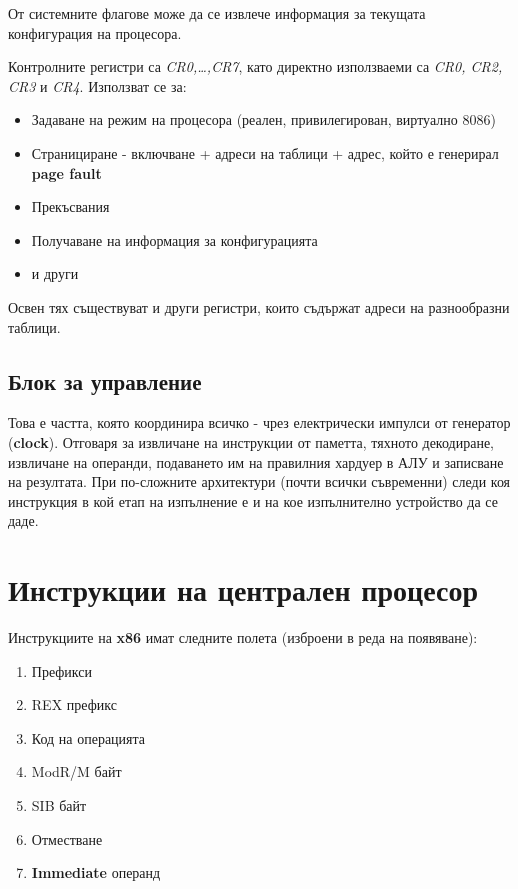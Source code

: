 \documentclass[fleqn,12pt]{article}
\begin{document}
От системните флагове може да се извлече информация за текущата конфигурация на процесора.

Контролните регистри са \textit{CR0,\dots,CR7}, като директно използваеми са \textit{CR0, CR2, CR3} и \textit{CR4}. Използват се за:
\begin{itemize}
    \item Задаване на режим на процесора (реален, привилегирован, виртуално 8086)
    \item Странициране - включване + адреси на таблици + адрес, който е генерирал \textbf{page fault}
    \item Прекъсвания
    \item Получаване на информация за конфигурацията
    \item и други
\end{itemize}

Освен тях съществуват и други регистри, които съдържат адреси на разнообразни таблици.

\subsection{Блок за управление}
Това е частта, която координира всичко - чрез електрически импулси от генератор (\textbf{clock}).
Отговаря за извличане на инструкции от паметта, тяхното декодиране, извличане на операнди, подаването им
на правилния хардуер в АЛУ и записване на резултата. При по-сложните архитектури (почти всички съвременни)
следи коя инструкция в кой етап на изпълнение е и на кое изпълнително устройство да се даде.

\section{Инструкции на централен процесор}
Инструкциите на \textbf{x86} имат следните полета (изброени в реда на появяване):
\begin{enumerate}
    \item Префикси
    \item REX префикс
    \item Код на операцията
    \item ModR/M байт
    \item SIB байт
    \item Отместване
    \item \textbf{Immediate} операнд
\end{enumerate}
\end{document}
